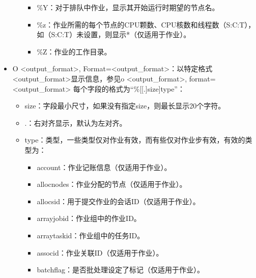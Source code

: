 \documentclass[a4paper,12pt,english]{sphinxmanual}
\begin{document}
\begin{itemize}
\begin{itemize}
\begin{itemize}
\item {} 
\sphinxAtStartPar
\%Y：对于排队中作业，显示其开始运行时期望的节点名。

\item {} 
\sphinxAtStartPar
\%z：作业所需的每个节点的CPU颗数、CPU核数和线程数（S:C:T），如（S:C:T）未设置，则显示*（仅适用于作业）。

\item {} 
\sphinxAtStartPar
\%Z：作业的工作目录。

\end{itemize}

\end{itemize}

\item {} 
\sphinxAtStartPar
\sphinxhyphen{}O <output\_format>, \sphinxhyphen{}\sphinxhyphen{}Format=<output\_format>：以特定格式<output\_format>显示信息，参见\sphinxhyphen{}o <output\_format>, \sphinxhyphen{}\sphinxhyphen{}format=<output\_format> 每个字段的格式为“\%{[}{[}.{]}size{]}type”：
\begin{itemize}
\item {} 
\sphinxAtStartPar
size：字段最小尺寸，如果没有指定size，则最长显示20个字符。

\item {} 
\sphinxAtStartPar
.：右对齐显示，默认为左对齐。

\item {} 
\sphinxAtStartPar
type：类型，一些类型仅对作业有效，而有些仅对作业步有效，有效的类型为：
\begin{itemize}
\item {} 
\sphinxAtStartPar
account：作业记账信息（仅适用于作业）。

\item {} 
\sphinxAtStartPar
allocnodes：作业分配的节点（仅适用于作业）。

\item {} 
\sphinxAtStartPar
allocsid：用于提交作业的会话ID（仅适用于作业）。

\item {} 
\sphinxAtStartPar
arrayjobid：作业组中的作业ID。

\item {} 
\sphinxAtStartPar
arraytaskid：作业组中的任务ID。

\item {} 
\sphinxAtStartPar
associd：作业关联ID（仅适用于作业）。

\item {} 
\sphinxAtStartPar
batchflag：是否批处理设定了标记（仅适用于作业）。


\end{itemize}
\end{itemize}
\end{itemize}
\end{document}
